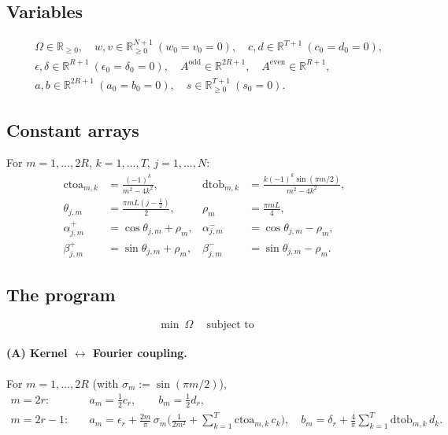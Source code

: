 \documentclass[11pt]{article}
\newcommand{\R}{\mathbb{R}}
\begin{document}
\subsection*{Variables}
\[
\begin{aligned}
&\Omega\in\R_{\ge0},\quad w,v\in\R^{N+1}_{\ge0}\ (w_0=v_0=0),\quad
  c,d\in\R^{T+1}\ (c_0=d_0=0),\\
&\epsilon,\delta\in\R^{R+1}\ (\epsilon_0=\delta_0=0),\quad
  A^{\mathrm{odd}}\in\R^{2R+1},\quad A^{\mathrm{even}}\in\R^{R+1},\\
&a,b\in\R^{2R+1}\ (a_0=b_0=0),\quad s\in\R^{T+1}_{\ge0}\ (s_0=0).
\end{aligned}
\]

\subsection*{Constant arrays}
For $m=1,\dots,2R$, $k=1,\dots,T$, $j=1,\dots,N$:
\[
\begin{aligned}
\mathrm{ctoa}_{m,k}&=\frac{(-1)^k}{m^2-4k^2}, &
\mathrm{dtob}_{m,k}&=\frac{k(-1)^k\sin(\pi m/2)}{m^2-4k^2},\\[4pt]
\theta_{j,m}&=\frac{\pi m L (j-\tfrac12)}{2}, &
\rho_m&=\frac{\pi m L}{4},\\[4pt]
\alpha^{+}_{j,m}&=\cos\theta_{j,m}+\rho_m, &
\alpha^{-}_{j,m}&=\cos\theta_{j,m}-\rho_m,\\
\beta^{+}_{j,m}&=\sin\theta_{j,m}+\rho_m, &
\beta^{-}_{j,m}&=\sin\theta_{j,m}-\rho_m.
\end{aligned}
\]

\subsection*{The program}
\[
\boxed{\ \min\ \Omega\ }\quad\text{subject to}
\]

\paragraph{(A) Kernel $\leftrightarrow$ Fourier coupling.} For $m=1,\dots,2R$
(with $\sigma_m:=\sin(\pi m/2)$),
\begin{align}
m=2r:\quad & a_m=\tfrac12 c_r,\qquad b_m=\tfrac12 d_r, \tag{E1}\\
m=2r-1:\quad & a_m=\epsilon_r+\frac{2m}{\pi}\,\sigma_m\Big(\frac{1}{2m^2}
   +\sum_{k=1}^{T}\mathrm{ctoa}_{m,k}\,c_k\Big),\quad
 b_m=\delta_r+\frac{4}{\pi}\sum_{k=1}^{T}\mathrm{dtob}_{m,k}\,d_k. \tag{E2}
\end{align}
\end{document}
